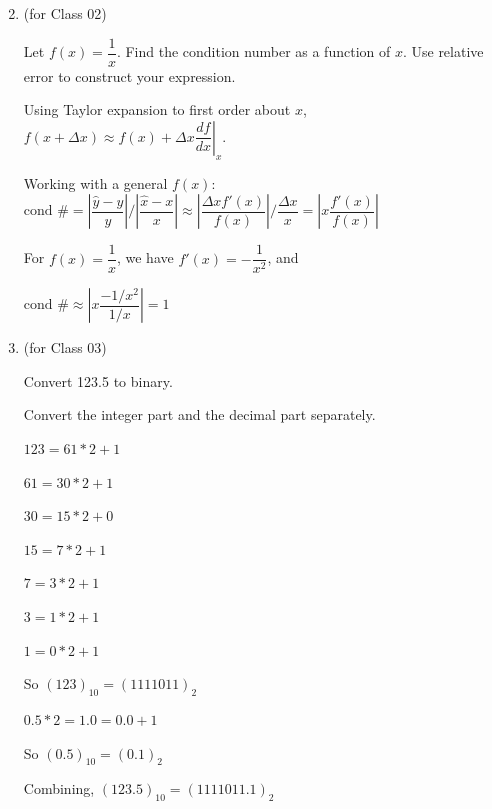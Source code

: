\documentclass[12pt,letterpaper,answers]{exam}
\begin{document}
 \pdfpageheight 11in 
  \pdfpagewidth 8.5in


\begin{enumerate}
\setcounter{enumi}{1}
\item (for Class 02)

Let $f(x) = \dfrac{1}{x}$.  Find the condition number as a function of $x$.  Use relative error to construct your expression.

\begin{solution}
Using Taylor expansion to first order about $x$, $f(x+\Delta x)\approx f(x) + \Delta x \left.\dfrac{df}{dx}\right\vert_x$.

Working with a general $f(x)$:
$\text{cond }\# = \left\vert\dfrac{\hat{y}-y}{y} \right\vert / \left\vert\dfrac{\hat{x}-x}{x} \right\vert \approx \left\vert \dfrac{\Delta xf'(x)}{f(x)} \right\vert / \dfrac{\Delta x}{x} = \left\vert x\dfrac{f'(x)}{f(x)}\right\vert$

For $f(x) = \dfrac{1}{x}$, we have $f'(x) = -\dfrac{1}{x^2}$, and

$\text{cond }\# \approx \left\vert x \dfrac{-1/x^2}{1/x} \right\vert  = 1$

\end{solution}

\item (for Class 03)

Convert 123.5 to binary.

\begin{solution}
    Convert the integer part and the decimal part separately.
    \begin{multicols}{2}
    
    $123 = 61*2 + 1$
    
    $61 = 30*2 + 1$
    
    $30 = 15*2 + 0$

    $15 = 7*2 + 1$

    $7 = 3*2 + 1$

    $3 = 1*2 + 1$

    $1 = 0*2 + 1$
    
    So $(123)_{10} = (1111011)_2 $
    
    \columnbreak
    
    $0.5 * 2 = 1.0 = 0.0 + 1$
    
    So $(0.5)_{10} = (0.1)_2$
    
    \end{multicols}
    
    Combining, $(123.5)_{10} = (1111011.1)_2$
\end{solution}


\end{enumerate}
\end{document}
